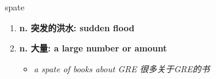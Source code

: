 
\begin{frame}
{\huge spate}
\begin{center}
\begin{enumerate}\Large
  \item \textbf{n. 突发的洪水: sudden flood}
  \item \textbf{n. 大量: a large number or amount}
  \begin{itemize}
    \item \em{\Large{a spate of books about GRE 很多关于GRE的书}}
  \end{itemize}
\end{enumerate}
\end{center}
\end{frame}
